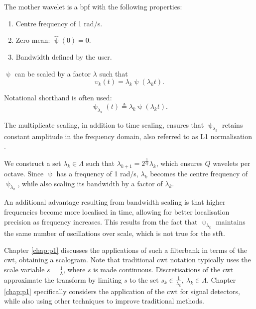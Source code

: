 The mother wavelet is a \ac{bpf} with the following properties:
\begin{enumerate}
    \item Centre frequency of 1 rad/s.
    \item Zero mean: $\hat{\uppsi}(0) = 0$.
    \item Bandwidth defined by the user.
\end{enumerate}


$\uppsi$ can be scaled by a factor $\lambda$ such that
\begin{equation}
    \upsilon_k(t) = \lambda_k \uppsi(\lambda_k t).
\end{equation}

Notational shorthand is often used: 
\begin{equation}
    \uppsi_{\lambda_k}(t) \triangleq \lambda_k \uppsi(\lambda_k t).
\end{equation}

The multiplicate scaling, in addition to time scaling, ensures that $\uppsi_{\lambda_k}$ retains constant amplitude in the frequency domain, also referred to as L1 normalisation \cite{waveletbook}.

We construct a set $\lambda_k \in \Lambda$ such that $\lambda_{k+1} = 2^\frac{1}{Q}\lambda_{k}$, which ensures $Q$ wavelets per octave. Since $\uppsi$ has a frequency of 1 rad/s, $\lambda_k$ becomes the centre frequency of $\uppsi_{\lambda_k}$, while also scaling its bandwidth by a factor of $\lambda_k$. 

An additional advantage resulting from bandwidth scaling is that higher frequencies become more localised in time, allowing for better localisation precision as frequency increases. This results from the fact that $\uppsi_{\lambda_k}$ maintains the same number of oscillations over scale, which is not true for the \ac{stft}.

Chapter \ref{chap:p1} discusses the applications of such a filterbank in terms of the \ac{cwt}, obtaining a scalogram. Note that traditional \ac{cwt} notation typically uses the scale variable $s = \frac{1}{\lambda}$, where $s$ is made continuous. Discretisations of the \ac{cwt} approximate the transform by limiting $s$ to the set $s_k \in \frac{1}{\lambda_k}, \ \lambda_k \in \Lambda$. Chapter \ref{chap:p1} specifically considers the application of the \ac{cwt} for signal detectors, while also using other techniques to improve traditional methods.

